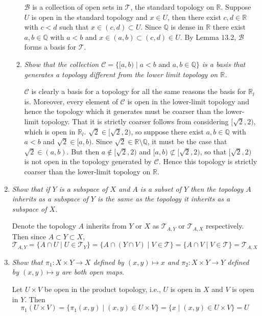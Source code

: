 \documentclass[letterpaper, 11pt]{article}
\newcommand{\Q}{\mathbb{Q}}
\newcommand{\R}{\mathbb{R}}
\newcommand{\T}{\mathcal{T}}
\begin{document}
\begin{enumerate}
\begin{enumerate}
$\mathcal{B}$ is a collection of open sets in $\T$, the standard topology on $\R$.  Suppose $U$ is open in the standard topology and $x \in U$, then there exist $c,d \in \R$ with $c < d$ such that $x \in (c,d) \subset U$.  Since $\Q$ is dense in $\R$ there exist $a,b \in \Q$ with $a < b$ and $x \in (a,b) \subset (c,d) \in U$.  By Lemma $13.2$, $\mathcal{B}$ forms a basis for $\T$.

\item \emph{Show that the collection $\mathcal{C} = \{[a,b) \mid a<b \mbox{ and } a,b \in \Q\}$ is a basis that generates a topology different from the lower limit topology on $\R$.}

$\mathcal{C}$ is clearly a basis for a topology for all the same reasons the basis for $\R_l$ is.  Moreover, every element of $\mathcal{C}$ is open in the lower-limit topology and hence the topology which it generates must be coarser than the lower-limit topology.  That it is strictly coarser follows from considering $[\sqrt{2}, 2)$, which is open in $\R_l$.  $\sqrt{2} \in [\sqrt{2}, 2)$, so suppose there exist $a,b \in \Q$ with $a < b$ and $\sqrt{2} \in [a,b)$.  Since $\sqrt{2} \in \R \setminus \Q$, it must be the case that $\sqrt{2} \in (a,b)$.  But then $a \notin [\sqrt{2}, 2)$ and $[a,b) \not\subset [\sqrt{2}, 2)$, so that $[\sqrt{2}, 2)$ is not open in the topology generated by $\mathcal{C}$.  Hence this topology is strictly coarser than the lower-limit topology on $\R$.

\end{enumerate}

\item \emph{Show that if $Y$ is a subspace of $X$ and $A$ is a subset of $Y$ then the topology $A$ inherits as a subspace of $Y$ is the same as the topology it inherits as a subspace of $X$.}

Denote the topology $A$ inherits from $Y$ or $X$ as $\T_{A,Y}$ or $\T_{A,X}$ respectively.  Then since $A \subset Y \subset X$,
\[
\T_{A,Y} = \{A \cap U \mid U \in \T_Y\} = \{A \cap (Y \cap V) \mid V \in \T\} = \{A \cap V \mid V \in \T\} = \T_{A,X}
\]

\item \emph{Show that $\pi_1: X \times Y \rightarrow X$ defined by $(x,y) \mapsto x$ and $\pi_2 : X \times Y \rightarrow Y$ defined by $(x,y) \mapsto y$ are both open maps.}

Let $U \times V$ be open in the product topology, i.e., $U$ is open in $X$ and $V$ is open in $Y$.  Then
\[
\pi_1\left(U \times V\right) = \{\pi_1(x,y) \mid (x,y) \in U \times V\} = \{x \mid (x,y) \in U \times V\} = U
\]


\end{enumerate}
\end{document}
